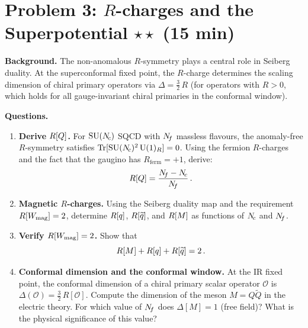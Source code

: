 \documentclass[11pt,a4paper]{article}
\begin{document}
\newpage


\section*{Problem 3: $R$-charges and the Superpotential
  \hfill $\star\star$ \normalsize(15 min)}
\label{prob:r-charges}

\noindent\textbf{Background.}
The non-anomalous $R$-symmetry plays a central role in Seiberg duality.
At the superconformal fixed point, the $R$-charge determines the
scaling dimension of chiral primary operators via
$\Delta = \tfrac{3}{2}\,R$ (for operators with $R > 0$, which holds for
all gauge-invariant chiral primaries in the conformal window).

\medskip

\noindent\textbf{Questions.}
\begin{enumerate}[label=(\alph*)]
  \item \textbf{Derive $R[Q]$.}  For $\mathrm{SU}(N_{\!c})$ SQCD with $N_{\!f}$
    massless flavours, the anomaly-free $R$-symmetry satisfies
    $\mathrm{Tr}[\mathrm{SU}(N_{\!c})^2\,\mathrm{U}(1)_R] = 0$.  Using the fermion $R$-charges
    and the fact that the gaugino has $R_{\mathrm{ferm}} = +1$, derive:
    \[
      R[Q] = \frac{N_{\!f} - N_{\!c}}{N_{\!f}}\,.
    \]

  \item \textbf{Magnetic $R$-charges.}  Using the Seiberg duality
    map and the requirement $R[W_{\mathrm{mag}}] = 2$,
    determine $R[q]$, $R[\widetilde{q}]$, and
    $R[M]$ as functions of $N_{\!c}$ and $N_{\!f}$.

  \item \textbf{Verify $R[W_{\mathrm{mag}}] = 2$.}  Show that
    \[
      R[M] + R[q] + R[\widetilde{q}] = 2\,.
    \]

  \item \textbf{Conformal dimension and the conformal window.}
    At the IR fixed point, the conformal dimension of a chiral primary
    scalar operator $\mathcal{O}$ is $\Delta(\mathcal{O}) =
    \tfrac{3}{2}\,R[\mathcal{O}]$.  Compute the dimension of the
    meson $M = Q\widetilde{Q}$ in the electric theory.  For which value
    of $N_{\!f}$ does $\Delta[M] = 1$ (free field)?  What is the physical
    significance of this value?
\end{enumerate}
\end{document}

